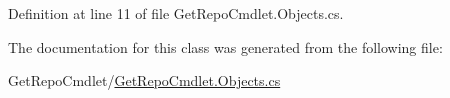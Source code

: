 Definition at line 11 of file Get\+Repo\+Cmdlet.\+Objects.\+cs.



The documentation for this class was generated from the following file\+:\begin{DoxyCompactItemize}
\item 
Get\+Repo\+Cmdlet/\mbox{\hyperlink{_get_repo_cmdlet_8_objects_8cs}{Get\+Repo\+Cmdlet.\+Objects.\+cs}}\end{DoxyCompactItemize}
